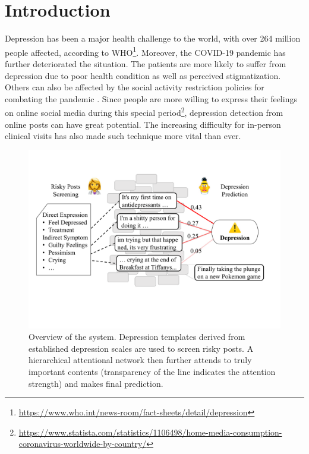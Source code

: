
\section{Introduction}

Depression has been a major health challenge to the world, with over 264 million people affected, according to WHO\footnote{\url{https://www.who.int/news-room/fact-sheets/detail/depression}}. Moreover, the COVID-19 pandemic has further deteriorated the situation. The patients are more likely to suffer from depression due to poor health condition as well as perceived stigmatization. Others can also be affected by the social activity restriction policies for combating the pandemic \citep{zhou2021detecting}. Since people are more willing to express their feelings on online social media during this special period\footnote{\url{https://www.statista.com/statistics/1106498/home-media-consumption-coronavirus-worldwide-by-country/}}, depression detection from online posts can have great potential. The increasing difficulty for in-person clinical visits has also made such technique more vital than ever.

\begin{figure}[tbp]
    \centering
    \includegraphics[width=\columnwidth]{figures/overview1.pdf}
    \caption{Overview of the system. Depression templates derived from established depression scales are used to screen risky posts. A hierarchical attentional network then further attends to truly important contents (transparency of the line indicates the attention strength) and makes final prediction. }
    \label{fig:overview}
\end{figure}

